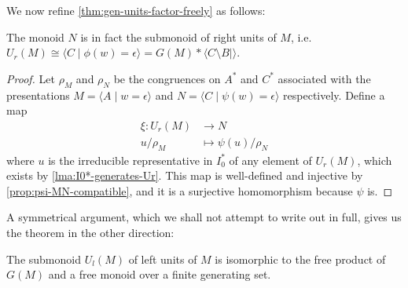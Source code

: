 \documentclass[noindex,noinsetproof,emphthm,12pt]{lmaths}
\begin{document}
We now refine \cref{thm:gen-units-factor-freely} as follows:

\begin{theorem} \label{thm:spec-units-factor-freely}
	The monoid $N$ is in fact the submonoid of right units of $M$, i.e. $U_r(M) \cong \langle C \mid \phi(w) = \epsilon \rangle = G(M) \ast \langle C \setminus B \mid \rangle$.
\end{theorem}
\begin{proof}
	Let $\rho_M$ and $\rho_N$ be the congruences on $A^*$ and $C^*$ associated with the presentations $M = \langle A \mid w = \epsilon \rangle$ and $N = \langle C \mid \psi(w) = \epsilon\rangle$ respectively.
	Define a map
		\begin{align*}
			\xi : U_r(M) &\to N \\
			 u/\rho_M &\mapsto \psi(u)/\rho_N
		\end{align*}
	where $u$ is the irreducible representative in $I_0^*$ of any element of $U_r(M)$, which exists by \cref{lma:I0*-generates-Ur}. This map is well-defined and injective by \cref{prop:psi-MN-compatible}, and it is a surjective homomorphism because $\psi$ is.
\end{proof}

A symmetrical argument, which we shall not attempt to write out in full, gives us the theorem in the other direction:
\begin{theorem}
	The submonoid $U_l(M)$ of left units of $M$ is isomorphic to the free product of $G(M)$ and a free monoid over a finite generating set.
\end{theorem}
\end{document}

